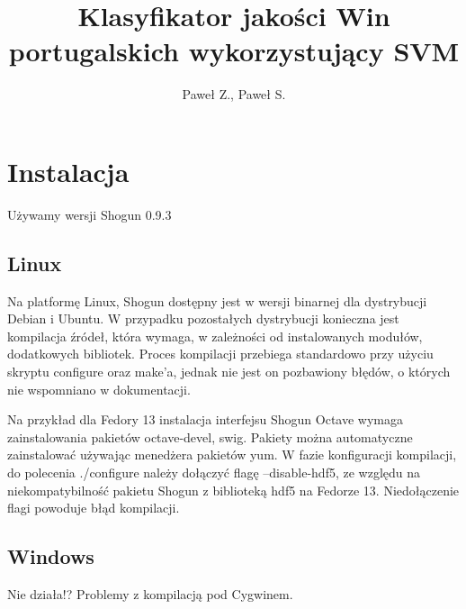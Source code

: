 \documentclass[10pt,a4paper]{article}
\author{Paweł Z., Paweł S.}
\title{Klasyfikator jakości Win portugalskich wykorzystujący SVM}
\begin{document}
\maketitle
\section{Instalacja}
Używamy wersji Shogun 0.9.3
\subsection{Linux}

Na platformę Linux, Shogun dostępny jest w wersji binarnej dla dystrybucji Debian i Ubuntu.
W przypadku pozostałych dystrybucji konieczna jest kompilacja źródeł, która wymaga, w zależności od 
instalowanych modułów, dodatkowych bibliotek. Proces kompilacji przebiega standardowo przy użyciu skryptu configure oraz make'a, jednak nie jest on pozbawiony błędów, o których nie wspomniano w dokumentacji.

Na przykład dla Fedory 13 instalacja interfejsu Shogun Octave wymaga zainstalowania pakietów octave-devel, swig. Pakiety można automatyczne zainstalować używając menedżera pakietów yum. W fazie konfiguracji kompilacji, do polecenia ./configure należy dołączyć flagę --disable-hdf5, ze względu na niekompatybilność pakietu Shogun z biblioteką hdf5 na Fedorze 13. Niedołączenie flagi powoduje błąd kompilacji. 


\subsection{Windows}
Nie działa!? Problemy z kompilacją pod Cygwinem.
\end{document}
